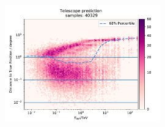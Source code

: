 \documentclass[aspectratio=1610, 9pt]{beamer}
\begin{document}
\begin{frame}
  \begin{figure}
    \centering
    \includegraphics[width=0.6\textwidth]{../analysis/plots/gamma/tel_vs_energy.pdf}
  \end{figure}
\end{frame}
\end{document}
